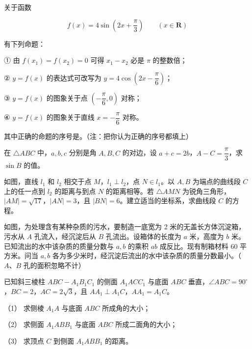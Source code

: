 \begin{question}
关于函数

\nopagebreak[4]
\[
f(x)=4\sin\left(2x+\frac\pi3\right)\qquad(x\in\mathbf R)
\]

有下列命题：

① 由 $f(x_1)=f(x_2)=0$ 可得 $x_1-x_2$ 必是 $\pi$ 的整数倍；

② $y=f(x)$ 的表达式可改写为 $y=4\cos\left(2x-\dfrac\pi6\right)$；

③ $y=f(x)$ 的图象关于点 $\left(-\dfrac\pi6,0\right)$ 对称；

④ $y=f(x)$ 的图象关于直线 $x=-\dfrac\pi6$ 对称。

其中正确的命题的序号是\gkblank{}。（注：把你认为正确的序号都填上）

\end{question}
\begin{question}
在 $\triangle ABC$ 中，$a,b,c$ 分别是角 $A,B,C$ 的对边，设 $a+c=2b$，$A-C=\dfrac\pi3$，求 $\sin B$ 的值。

\Needspace{0.4\textheight}
\end{question}
\begin{question}
如图，直线 $l_1$ 和 $l_2$ 相交于点 $M$，$l_1\perp l_2$，点 $N\in l_1$。以 $A,B$ 为端点的曲线段 $C$ 上的任一点到 $l_2$ 的距离与到点 $N$ 的距离相等。若 $\triangle AMN$ 为锐角三角形，$|AM|=\sqrt{17}$，$|AN|=3$，且 $|BN|=6$。建立适当的坐标系，求曲线段 $C$ 的方程。
\nopagebreak[4]
\begin{center}\end{center}
\nopagebreak[4]
\Needspace{0.4\textheight}
\end{question}
\begin{question}
如图，为处理含有某种杂质的污水，要制造一底宽为 2 米的无盖长方体沉淀箱，污水从 $A$ 孔流入，经沉淀后从 $B$ 孔流出。设箱体的长度为 $a$ 米，高度为 $b$ 米。已知流出的水中该杂质的质量分数与 $a,b$ 的乘积 $ab$ 成反比。现有制箱材料 60 平方米。问当 $a,b$ 各为多少米时，经沉淀后流出的水中该杂质的质量分数最小。（$A\text{、}B$ 孔的面积忽略不计）
\nopagebreak[4]
\begin{center}\end{center}
\nopagebreak[4]
\Needspace{0.4\textheight}
\end{question}
\begin{question}
已知斜三棱柱 $ABC-A_1B_1C_1$ 的侧面 $A_1ACC_1$ 与底面 $ABC$ 垂直，$\angle ABC=90^\circ$，$BC=2$，$AC=2\sqrt3$，且 $AA_1\perp A_1C$，$AA_1=A_1C$。

（1） 求侧棱 $A_1A$ 与底面 $ABC$ 所成角的大小；

（2） 求侧面 $A_1ABB_1$ 与底面 $ABC$ 所成二面角的大小；

（3） 求顶点 $C$ 到侧面 $A_1ABB_1$ 的距离。
\nopagebreak[4]
\begin{center}\end{center}
\nopagebreak[4]
\end{question}
